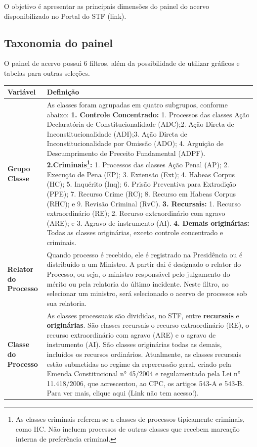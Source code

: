 \documentclass[
]{book}
\begin{document}
O objetivo é apresentar as principais dimensões do painel do acervo disponibilizado no Portal do STF (link).

\hypertarget{taxonomia-do-painel}{%
\subsection{Taxonomia do painel}\label{taxonomia-do-painel}}

O painel de acervo possui 6 filtros, além da possibilidade de utilizar gráficos e tabelas para outras seleções.

\begin{longtable}[]{@{}
  >{\raggedright\arraybackslash}p{}
  >{\raggedright\arraybackslash}p{}@{}}
\toprule
Variável & Definição \\
\midrule
\endhead
\textbf{Grupo Classe} & As classes foram agrupadas em quatro subgrupos, conforme abaixo: \textbf{1. Controle Concentrado:} 1. Processos das classes Ação Declaratória de Constitucionalidade (ADC);2. Ação Direta de Inconstitucionalidade (ADI);3. Ação Direta de Inconstitucionalidade por Omissão (ADO); 4. Arguição de Descumprimento de Preceito Fundamental (ADPF). \textbf{2.Criminais\footnote{As classes criminais referem-se a classes de processos tipicamente criminais, como HC. Não incluem processos de outras classes que recebem marcação interna de preferência criminal.}:} 1. Processos das classes Ação Penal (AP); 2. Execução de Pena (EP); 3. Extensão (Ext); 4. Habeas Corpus (HC); 5. Inquérito (Inq); 6. Prisão Preventiva para Extradição (PPE); 7. Recurso Crime (RC); 8. Recurso em Habeas Corpus (RHC); e 9. Revisão Criminal (RvC). \textbf{3. Recursais:} 1. Recurso extraordinário (RE); 2. Recurso extraordinário com agravo (ARE); e 3. Agravo de instrumento (AI). \textbf{4. Demais originárias:} Todas as classes originárias, exceto controle concentrado e criminais. \\
\textbf{Relator do Processo} & Quando processo é recebido, ele é registrado na Presidência ou é distribuído a um Ministro. A partir dai é designado o relator do Processo, ou seja, o ministro responsável pelo julgamento do mérito ou pela relatoria do último incidente. Neste filtro, ao selecionar um ministro, será selecionado o acervo de processos sob sua relatoria. \\
\textbf{Classe do Processo} & As classes processuais são divididas, no STF, entre \textbf{recursais} e \textbf{originárias}. São classes recursais o recurso extraordinário (RE), o recurso extraordinário com agravo (ARE) e o agravo de instrumento (AI). São classes originárias todas as demais, incluídos os recursos ordinários. Atualmente, as classes recursais estão submetidas ao regime da repercussão geral, criado pela Emenda Constitucional n° 45/2004 e regulamentado pela Lei n° 11.418/2006, que acrescentou, ao CPC, os artigos 543-A e 543-B. Para ver mais, clique aqui (Link não tem acesso!). \\

\end{longtable}
\end{document}

